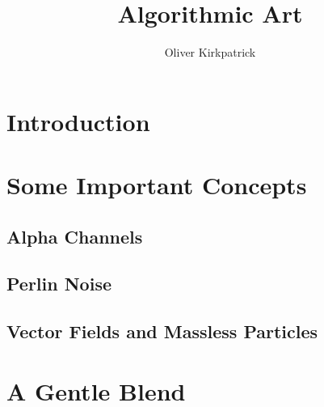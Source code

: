 \documentclass[a4paper]{article}
\author{Oliver Kirkpatrick}
\title{Algorithmic Art}
\begin{document}
\maketitle
\section{Introduction}
\section{Some Important Concepts}
\subsection{Alpha Channels}
\subsection{Perlin Noise}
\subsection{Vector Fields and Massless Particles}
\section{A Gentle Blend}
\end{document}
